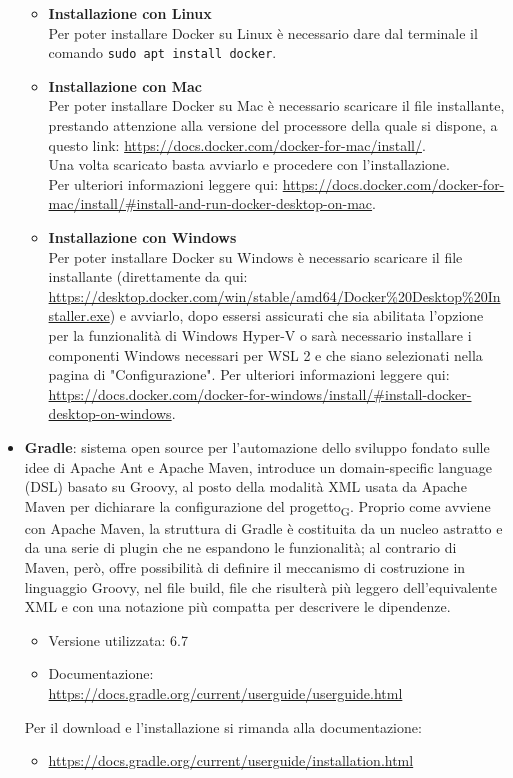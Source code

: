 \begin{itemize}
	\begin{itemize}
	\item \textbf{Installazione con Linux}\\
	Per poter installare Docker su Linux è necessario dare dal terminale il comando \texttt{sudo apt install docker}.
		
	\item \textbf{Installazione con Mac}\\Per poter installare Docker su Mac è necessario scaricare il file installante, prestando attenzione alla versione del processore della quale si dispone, a questo link: \url{https://docs.docker.com/docker-for-mac/install/}. 
	\\Una volta scaricato basta avviarlo e procedere con l'installazione. \\Per ulteriori informazioni leggere qui: \url{https://docs.docker.com/docker-for-mac/install/#install-and-run-docker-desktop-on-mac}.
	
	\item \textbf{Installazione con Windows}\\
		Per poter installare Docker su Windows è necessario scaricare il file installante (direttamente da qui: \url{https://desktop.docker.com/win/stable/amd64/Docker\%20Desktop\%20Installer.exe}) e avviarlo, dopo essersi assicurati che sia abilitata l'opzione per la funzionalità di Windows Hyper-V o sarà necessario installare i componenti Windows necessari per WSL 2 e che siano selezionati nella pagina di "Configurazione". Per ulteriori informazioni leggere qui: \url{https://docs.docker.com/docker-for-windows/install/#install-docker-desktop-on-windows}.
	\end{itemize}

		
	\item \textbf{Gradle}: sistema open source per l'automazione dello sviluppo fondato sulle idee di Apache Ant e Apache Maven, introduce un domain-specific language (DSL) basato su Groovy, al posto della modalità XML usata da Apache Maven per dichiarare la configurazione del progetto\textsubscript{G}. Proprio come avviene con Apache Maven, la struttura di Gradle è costituita da un nucleo astratto e da una serie di plugin che ne espandono le funzionalità; al contrario di Maven, però, offre possibilità di definire il meccanismo di costruzione in linguaggio Groovy, nel file build, file che risulterà più leggero dell'equivalente XML e con una notazione più compatta per descrivere le dipendenze.
	\begin{itemize}
		\item Versione utilizzata: 6.7
		\item Documentazione: \url{https://docs.gradle.org/current/userguide/userguide.html}
	\end{itemize}
	Per il download e l'installazione si rimanda alla documentazione:
	\begin{itemize}
		\item \url{https://docs.gradle.org/current/userguide/installation.html}
	\end{itemize}

\end{itemize}


